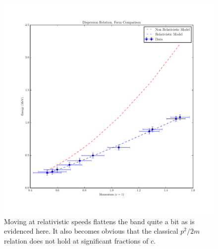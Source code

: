 \documentclass[reprint, nobibnotes, amssymb, amsmath, amsfonts, physics, mathtools, mathrsfs, floatfix]{revtex4-1}
\begin{document}
\begin{widetext}
      \begin{figure}[h]
        \centering
        \includegraphics[width=\linewidth]{../plots/rel_dispersion.pdf}
        \caption{Moving at relativistic speeds flattens the band quite a bit as is evidenced here.  It also becomes obvious that the classical $p^2/2m$ relation does not hold at significant fractions of $c$. \label{fig:rel_dispersion}}
      \end{figure}
    \end{widetext}




\end{document}
